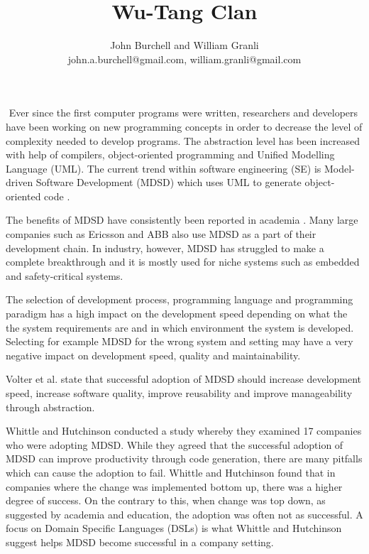 \documentclass[10pt,twocolumn]{article}
\begin{document}
\title{Wu-Tang Clan}

\author{John Burchell and William Granli \\
john.a.burchell@gmail.com, william.granli@gmail.com}


\maketitle
\thispagestyle{empty}




​
Ever since the first computer programs were written, researchers and developers have been working on new programming concepts in order to decrease the level of complexity needed to develop programs. The abstraction level has been increased with help of compilers, object-oriented programming and Unified Modelling Language (UML). The current trend within software engineering (SE) is Model-driven Software Development (MDSD) which uses UML to generate object-oriented code \cite{staron2006adopting}. 

The benefits of MDSD have consistently been reported in academia \cite{staron2006adopting} \cite{volter2013model}. Many large companies such as Ericsson and ABB \cite{staron2006adopting} also use MDSD as a part of their development chain. In industry, however, MDSD has struggled to make a complete breakthrough and it is mostly used for niche systems such as embedded and safety-critical systems.


The selection of development process, programming language and programming paradigm has a high impact on the development speed depending on what the the system requirements are and in which environment the system is developed. Selecting for example MDSD for the wrong system and setting may have a very negative impact on development speed, quality and maintainability. 


Volter et al. \cite{volter2013model} state that successful adoption of MDSD should increase development speed, increase software quality, improve reusability and improve manageability through abstraction.

Whittle and Hutchinson \cite{whittle2012mismatches} conducted a study whereby they examined 17 companies who were adopting MDSD. While they agreed that the successful adoption of MDSD can improve productivity through code generation, there are many pitfalls which can cause the adoption to fail. Whittle and Hutchinson found that in companies where the change was implemented bottom up, there was a higher degree of success. On the contrary to this, when change was top down, as suggested by academia and education, the adoption was often not as successful. A focus on Domain Specific Languages (DSLs) is what Whittle and Hutchinson suggest helps MDSD become successful in a company setting.
\end{document}
